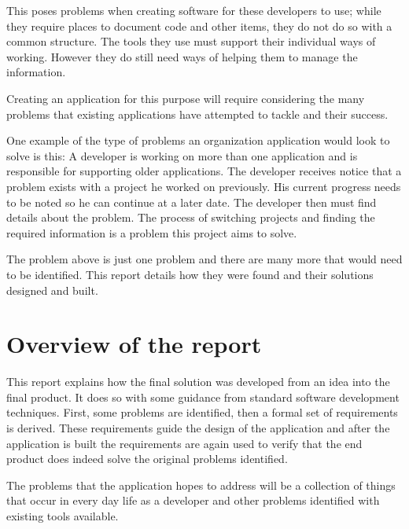 This poses problems when creating software for these developers to use; while
they require places to document code and other items, they do not do so with a
common structure. The tools they use must support their individual ways of
working. However they do still need ways of helping them to manage the
information.

Creating an application for this purpose will require considering the many
problems that existing applications have attempted to tackle and their success.

One example of the type of problems an organization application would look to
solve is this: A developer is working on more than one application and is
responsible for supporting older applications. The developer receives notice
that a problem exists with a project he worked on previously. His current
progress needs to be noted so he can continue at a later date. The developer
then must find details about the problem. The process of switching projects and
finding the required information is a problem this project aims to solve.

The problem above is just one problem and there are many more that would need to
be identified. This report details how they were found and their solutions
designed and built.

\section{Overview of the report}\label{overview-of-the-report}

This report explains how the final solution was developed from an idea
into the final product. It does so with some guidance from standard
software development techniques. First, some problems are identified, then
a formal set of requirements is derived. These requirements guide the
design of the application and after the application is built the
requirements are again used to verify that the end product does indeed
solve the original problems identified.

The problems that the application hopes to address will be a collection
of things that occur in every day life as a developer and other problems
identified with existing tools available.
